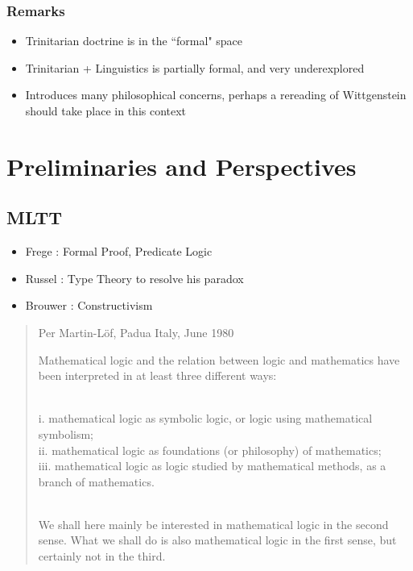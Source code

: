 \documentclass[10pt]{beamer}
\begin{document}
\begin{frame}[fragile]
\frametitle{Remarks}
\centering
\begin{itemize}
\item Trinitarian doctrine is in the ``formal" space
\item Trinitarian + Linguistics is partially formal, and very underexplored
\item Introduces many philosophical concerns, perhaps a rereading of
  Wittgenstein should take place in this context
\end{itemize}
\end{frame}

\section{Preliminaries and Perspectives}

\subsection{MLTT}

\begin{frame}

\begin{itemize}
  \item Frege : Formal Proof, Predicate Logic
  \item Russel : Type Theory to resolve his paradox
  \item Brouwer : Constructivism
\end{itemize}

\end{frame}

\begin{frame}

\begin{quote}{Per Martin-Löf, Padua Italy, June 1980}

Mathematical logic and the relation between logic and mathematics have been
interpreted in at least three different ways:
\newline

\\
i. mathematical logic as symbolic logic, or logic using mathematical symbolism; \\
ii. mathematical logic as foundations (or philosophy) of mathematics;\\
iii. mathematical logic as logic studied by mathematical methods, as a branch of mathematics.
\newline

\\
We shall here mainly be interested in mathematical logic in the second sense.
What we shall do is also mathematical logic in the first sense, but certainly
not in the third.
\end{quote}
\end{frame}
\end{document}
